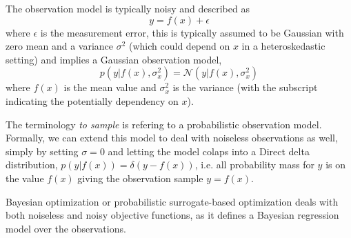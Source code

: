 The observation model is typically noisy and described as
$$y = f(x)+\epsilon$$ where $\epsilon$ is the measurement error, this is
typically assumed to be Gaussian with zero mean and a variance
$\sigma^2$ (which could depend on $x$ in a heteroskedastic setting) and implies a Gaussian observation model, 
$$p(y|f(x),\sigma_x^2) = \mathcal{N}(y|f(x),\sigma_x^2)$$ where $f(x)$ is the mean value and
$\sigma_x^2$ is the variance (with the subscript indicating the potentially dependency on $x$). 
\begin{note2}
    The terminology \textit{to sample} is refering to a probabilistic observation model. Formally, we
    can extend this model to deal with noiseless observations as well, simply by setting
    $\sigma = 0$ and letting the model colaps into a Direct delta distribution, $p(y|f(x)) =
    \mathcal{\delta}(y-f(x))$, i.e. all probability mass for $y$ is on the value $f(x)$ giving the
    observation sample $y = f(x)$. 
\end{note2}


Bayesian optimization or probabilistic surrogate-based optimization deals with both noiseless and noisy objective functions,
as it defines a Bayesian regression model over the observations.


